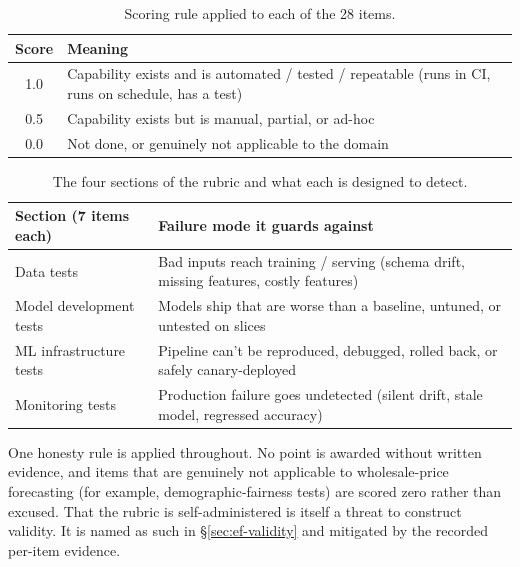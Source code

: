 \begin{table}[h]
  \centering
  \caption{Scoring rule applied to each of the 28 items.}
  \label{tab:ef-mlts-rules}
  \begin{tabularx}{\linewidth}{@{}c X@{}}
    \toprule
    \textbf{Score} & \textbf{Meaning} \\
    \midrule
    1.0 & Capability exists and is automated / tested / repeatable (runs in CI, runs on schedule, has a test) \\
    0.5 & Capability exists but is manual, partial, or ad-hoc \\
    0.0 & Not done, or genuinely not applicable to the domain \\
    \bottomrule
  \end{tabularx}
\end{table}

\begin{table}[h]
  \centering
  \caption{The four sections of the rubric and what each is designed to detect.}
  \label{tab:ef-mlts-sections}
  \begin{tabularx}{\linewidth}{@{}l X@{}}
    \toprule
    \textbf{Section (7 items each)} & \textbf{Failure mode it guards against} \\
    \midrule
    Data tests                  & Bad inputs reach training / serving (schema drift, missing features, costly features) \\
    Model development tests     & Models ship that are worse than a baseline, untuned, or untested on slices \\
    ML infrastructure tests     & Pipeline can't be reproduced, debugged, rolled back, or safely canary-deployed \\
    Monitoring tests             & Production failure goes undetected (silent drift, stale model, regressed accuracy) \\
    \bottomrule
  \end{tabularx}
\end{table}

One honesty rule is applied throughout. No point is awarded without written
evidence, and items that are genuinely not applicable to wholesale-price
forecasting (for example, demographic-fairness tests) are scored zero rather than
excused. That the rubric is self-administered is itself a threat to construct
validity. It is named as such in \S\ref{sec:ef-validity} and mitigated by the
recorded per-item evidence.

